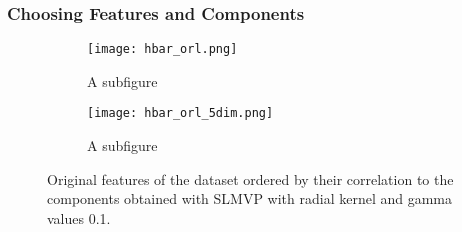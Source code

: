 \subsubsection{Choosing Features and Components}

\begin{figure}[!ht]
    \centering
    \begin{subfigure}{.5\textwidth}
        \centering
        \texttt{[image: hbar\_orl.png]}
        \caption{A subfigure}
    \end{subfigure}%
    \begin{subfigure}{.5\textwidth}
        \centering
        \texttt{[image: hbar\_orl\_5dim.png]}
        \caption{A subfigure}
    \end{subfigure}
    \caption{Original features of the dataset ordered by their correlation to the components obtained with SLMVP with radial kernel and gamma values 0.1.}
    \label{fig:test}
\end{figure}